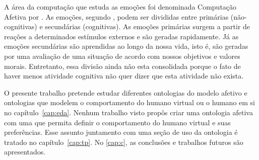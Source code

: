 
A área da computação que estuda as emoções foi denominada Computação Afetiva por
\citet{Pic98}. As emoções, segundo \citet{damasio2004erro}, podem ser divididas
entre primárias (não-cognitivas) e secundárias (cognitivas). As emoções
primárias surgem a partir de reações a determinados estímulos externos e são
geradas rapidamente. Já as emoções secundárias são aprendidas ao longo da
nossa vida, isto é, são geradas por uma avaliação de uma situação de acordo
com nossos objetivos e valores morais. Entretanto, essa divisão ainda não esta
consolidada porque o fato de haver menos atividade cognitiva não quer dizer
que esta atividade não exista.

O presente trabalho pretende estudar diferentes ontologias do modelo afetivo e
ontologias que modelem o comportamento do humano virtual ou o humano em si no
capítulo~\ref{cap:eda}. Nenhum trabalho visto propôs criar uma ontologia
afetiva com uma que permita definir o comportamento do humano virtual e suas
preferências. Esse assunto juntamento com uma seção de uso da ontologia é
tratado no capítulo~\ref{cap:tp}. No \ref{cap:c}, as conclusões e trabalhos
futuros são apresentados.

